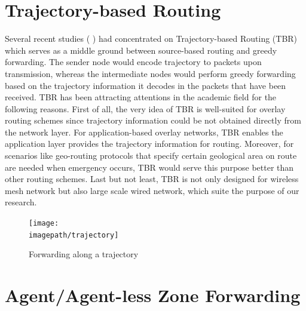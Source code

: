 \documentclass[conference]{IEEEtran}
\newcommand{\imagepath}{../../images/external/location_routing}
\begin{document}

\section{Trajectory-based Routing}

Several recent studies ( \cite{Niculescu2003} \cite{Niculescu2004} \cite{Yuksel2006} ) had concentrated on Trajectory-based Routing (TBR) which serves as a middle ground between source-based routing and greedy forwarding. The sender node would encode trajectory to packets upon transmission, whereas the intermediate nodes would perform greedy forwarding based on the trajectory information it decodes in the 
packets that have been received. TBR has been attracting attentions in the academic field for the following reasons. First of all, the very idea of TBR is well-suited for overlay routing schemes since trajectory information could be not obtained directly from the network layer. For application-based overlay networks, TBR enables
the application layer provides the trajectory information for routing. Moreover, for scenarios like geo-routing protocols that specify certain geological area on route are needed when emergency occurs, TBR would serve this purpose better than other routing schemes. Last but not least, TBR is not only designed for wireless mesh network but also 
large scale wired network, which suite the purpose of our research.

\begin{figure}
\label{fig:trajectory}
\centering
\texttt{[image: \\imagepath/trajectory]}
\caption{Forwarding along a trajectory}
\end{figure}

\section{Agent/Agent-less Zone Forwarding}
\end{document}
